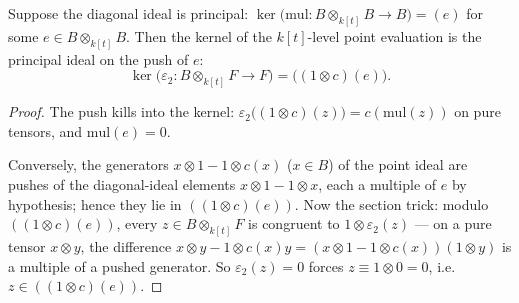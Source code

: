 \begin{theorem}
  \label{thm:ker_pointEvTwo}
  \leanok
  Suppose the diagonal ideal is principal:
  \(\ker\bigl(\mathrm{mul} \colon B \otimes_{k[t]} B \to B\bigr) = (e)\) for some
  \(e \in B \otimes_{k[t]} B\). Then the kernel of the \(k[t]\)-level point evaluation is
  the principal ideal on the push of \(e\):
  \[
    \ker\bigl(\varepsilon_2 \colon B \otimes_{k[t]} F \to F\bigr)
      = \bigl((1 \otimes c)(e)\bigr).
  \]
\end{theorem}
\begin{proof}
  \leanok
  The push kills into the kernel: \(\varepsilon_2\bigl((1 \otimes c)(z)\bigr) =
  c(\mathrm{mul}(z))\) on pure tensors, and \(\mathrm{mul}(e) = 0\).

  Conversely, the generators \(x \otimes 1 - 1 \otimes c(x)\) (\(x \in B\)) of the point
  ideal are pushes of the diagonal-ideal elements \(x \otimes 1 - 1 \otimes x\), each a
  multiple of \(e\) by hypothesis; hence they lie in \(((1\otimes c)(e))\). Now the section
  trick: modulo \(((1\otimes c)(e))\), every \(z \in B \otimes_{k[t]} F\) is congruent to
  \(1 \otimes \varepsilon_2(z)\) — on a pure tensor \(x \otimes y\), the difference
  \(x \otimes y - 1 \otimes c(x)y = (x \otimes 1 - 1 \otimes c(x))(1 \otimes y)\) is a
  multiple of a pushed generator. So \(\varepsilon_2(z) = 0\) forces
  \(z \equiv 1 \otimes 0 = 0\), i.e.\ \(z \in ((1\otimes c)(e))\).
\end{proof}

